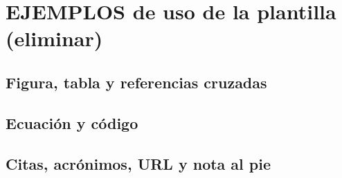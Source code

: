 \chapter{EJEMPLOS de uso de la plantilla (eliminar)}
\label{anx:ejemplos}

\section{Figura, tabla y referencias cruzadas}

\section{Ecuación y código}

\section{Citas, acrónimos, URL y nota al pie}
